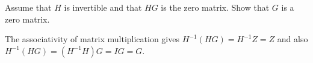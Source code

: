 
\begin{Exercise}[
name={},
title={}, 
difficulty=0,
origin={\cite{JH}}]
    Assume that \( H \) is invertible and that \( HG \) is the zero matrix.
    Show that \( G \) is a zero matrix.
\end{Exercise}
\begin{Answer}
      The associativity of matrix multiplication gives
      \( H^{-1}(HG)=H^{-1}Z=Z \) and also
      \( H^{-1}(HG)=(H^{-1}H)G=IG=G \).
\end{Answer}
